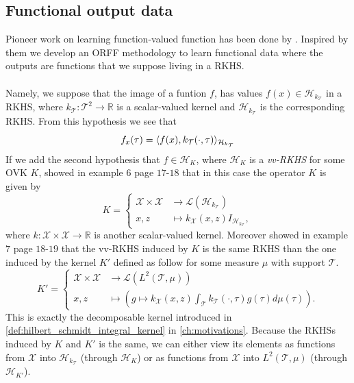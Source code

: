 \subsection{Functional output data}
Pioneer work on learning function-valued function has been done by
\citet{kadri2015operator}. Inspired by them we develop an \acs{ORFF}
methodology to learn functional data where the outputs are functions that we
suppose living in a \acs{RKHS}.
\paragraph{}
Namely, we suppose that the image of a funtion $f$, has values $f(x) \in
\mathcal{H}_{k_{\mathcal{T}}}$ in a \acs{RKHS}, where
$k_{\mathcal{T}}:\mathcal{T}^2\to\mathbb{R}$ is a scalar-valued kernel and
$\mathcal{H}_{k_{\mathcal{T}}}$ is the corresponding \acs{RKHS}. From this
hypothesis we see that
\begin{dmath*}
    f_x(\tau) = \inner{f(x), k_{\mathcal{T}}(\cdot,
    \tau)}_{\mathcal{H}_{k_{\mathcal{T}}}}
\end{dmath*}
If we add the second hypothesis that $f\in\mathcal{H}_K$, where $\mathcal{H}_K$
is a \emph{\acl{vv-RKHS}} for some \acl{OVK} $K$,  showed in
example $6$ page $17$-$18$ that in this case the operator $K$ is given by
\begin{dmath}
    \label{eq:functional_kernel}
    K =
    \begin{cases}
        \mathcal{X} \times \mathcal{X} & \to
        \mathcal{L}(\mathcal{H}_{k_{\mathcal{T}}}) \\
        x, z & \mapsto k_{\mathcal{X}}(x, z) I_{\mathcal{H}_{k_{\mathcal{T}}}},
    \end{cases}
\end{dmath}
where $k:\mathcal{X}\times\mathcal{X} \to \mathbb{R}$ is another scalar-valued
kernel. Moreover \citet{Carmeli2010} showed in example $7$ page $18$-$19$ that
the \acs{vv-RKHS} induced by $K$ is the same \acs{RKHS} than the one induced by
the kernel $K'$ defined as follow for some measure $\mu$ with support
$\mathcal{T}$.
\begin{dmath*}
    K' =
    \begin{cases}
        \mathcal{X} \times \mathcal{X} & \to
        \mathcal{L}\left(L^2(\mathcal{T}, \mu)\right) \\
        x, z & \mapsto \left(g \mapsto k_{\mathcal{X}}(x, z)
        \int_{\mathcal{T}}k_{\mathcal{T}}(\cdot, \tau)g(\tau)d\mu(\tau)\right).
    \end{cases}
\end{dmath*}
This is exactly the decomposable kernel introduced in
\cref{def:hilbert_schmidt_integral_kernel} in \cref{ch:motivations}. Because
the \acsp{RKHS} induced by $K$ and $K'$ is the same, we can either view its
elements as functions from $\mathcal{X}$ into $\mathcal{H}_{k_{\mathcal{T}}}$
(through $\mathcal{H}_K$) or as functions from $\mathcal{X}$ into
$L^2(\mathcal{T}, \mu)$ (through $\mathcal{H}_{K'}$).


